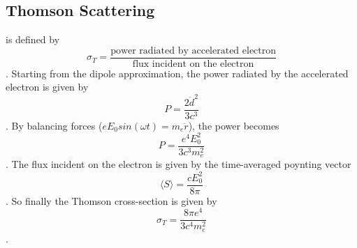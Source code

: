 \subsection{Thomson Scattering}\label{sec:thomson}
 is defined by
\begin{dmath*}
\sigma_T = \frac{\text{power radiated by accelerated electron}}{\text{flux incident on the electron}}
\end{dmath*}.
Starting from the dipole approximation, the power radiated by the accelerated electron is given by
\begin{dmath}
P = \frac{2{\ddot d}^2}{3c^3}
\end{dmath}.
By balancing forces ($eE_0sin(\omega t) = m_e\ddot r$), the power becomes
\begin{dmath}
P = \frac{e^4E_0^2}{3c^3m_e^2}
\end{dmath}.
The flux incident on the electron is given by the time-averaged poynting vector
\begin{dmath}
\langle S\rangle = \frac{cE_0^2}{8\pi}
\end{dmath}.
So finally the Thomson cross-section is given by
\begin{dmath}\boxed{
\sigma_T = \frac{8\pi e^4}{3c^4m_e^2}
}\end{dmath}.


